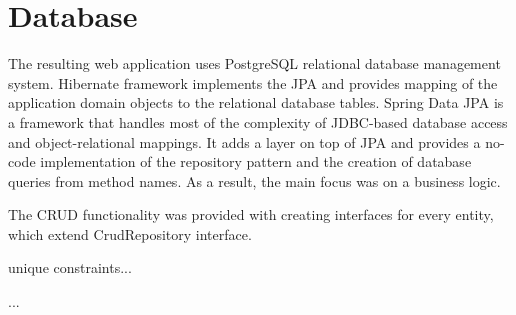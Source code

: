 \section{Database}
The resulting web application uses PostgreSQL relational database management system. Hibernate framework implements the JPA and provides mapping of the application domain objects to the relational database tables. Spring Data JPA is a framework that handles most of the complexity of JDBC-based database access and object-relational mappings. It adds a layer on top of JPA and provides a no-code implementation of the repository pattern and the creation of database queries from method names. As a result, the main focus was on a business logic.

The CRUD functionality was provided with creating interfaces for every entity, which extend CrudRepository interface.


unique constraints...

...

